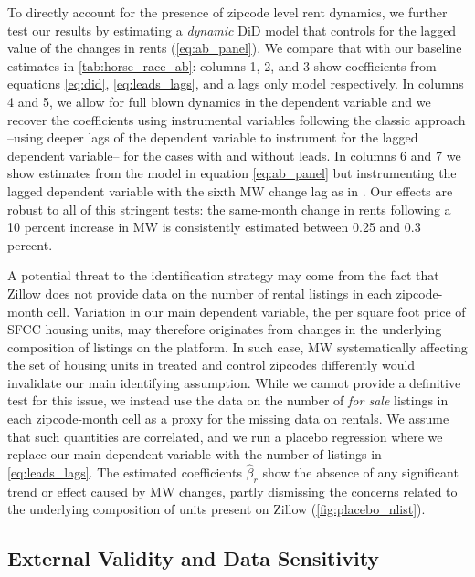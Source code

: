 To directly account for the presence of zipcode level rent dynamics, we further test our results by 
estimating a \textit{dynamic} DiD model that controls for the lagged value of the changes in rents 
(\autoref{eq:ab_panel}). We compare that with our baseline estimates in 
\autoref{tab:horse_race_ab}: columns 1, 2, and 3 show coefficients from equations \eqref{eq:did}, 
\eqref{eq:leads_lags}, and a lags only model respectively. In columns 4 and 5, we allow for full blown 
dynamics in the dependent variable and we recover the coefficients using instrumental variables 
following the classic \textcite{ArellanoBond1991} approach --using deeper lags of the dependent 
variable to instrument for the lagged dependent variable-- for the cases with and without leads. 
In columns 6 and 7 we show estimates from the model in equation \ref{eq:ab_panel} but instrumenting 
the lagged dependent variable with the sixth MW change lag as in \textcite{MeerWest2016}. Our 
effects are robust to all of this stringent tests: the same-month change in rents following a 10 
percent increase in MW is consistently estimated between 0.25 and 0.3 percent. 

A potential threat to the identification strategy may come from the fact that Zillow does not provide
data on the number of rental listings in each zipcode-month cell. Variation in our main dependent variable, 
the per square foot price of SFCC housing units, may therefore originates from changes in the underlying 
composition of listings on the platform. In such case, MW systematically affecting the set of housing units  
in treated and control zipcodes differently would invalidate our main identifying assumption. While we cannot
provide a definitive test for this issue, we instead use the data on the number of \textit{for sale} listings in 
each zipcode-month cell as a proxy for the missing data on rentals. We assume that such quantities are
correlated, and we run a placebo regression where we replace our main dependent variable with the number of 
listings in \autoref{eq:leads_lags}. The estimated coefficients $\hat{\beta}_r$ show the absence of any 
significant trend or effect caused by MW changes, partly dismissing the concerns related to the underlying 
composition of units present on Zillow (\autoref{fig:placebo_nlist}). %

\subsection{External Validity and Data Sensitivity}\label{sec:sample_rest}

